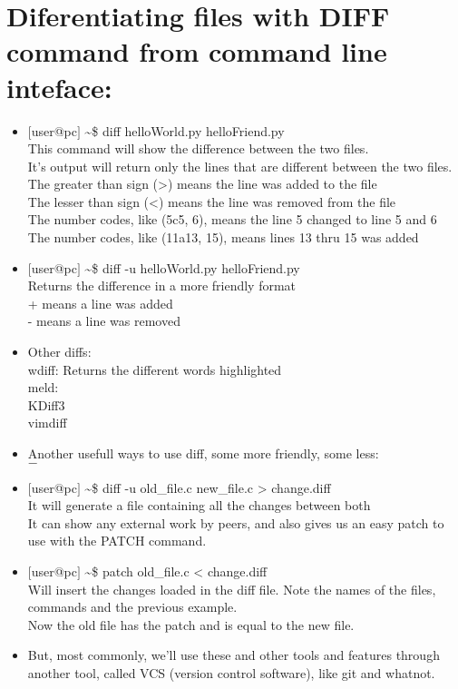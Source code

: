 \documentclass[12pt,a4paper]{article} %
\begin{document}
\section{Diferentiating files with DIFF command from command line inteface:}
\begin{itemize}
\item $[$user@pc$]$ \textasciitilde\$ diff helloWorld.py helloFriend.py\\
\tabto{1.1cm} This command will show the difference between the two files.\\
\tabto{1.1cm}It's output will return only the lines that are different between the two files.\\
\tabto{2.2cm}The greater than sign (>) means the line was added to the file\\
\tabto{2.2cm}The lesser than sign (<) means the line was removed from the file\\
\tabto{2.2cm}The number codes, like (5c5, 6), means the line 5 changed to line 5 and 6\\
\tabto{2.2cm}The number codes, like (11a13, 15), means lines 13 thru 15 was added\\
\item $[$user@pc$]$ \textasciitilde\$ diff -u helloWorld.py helloFriend.py\\
\tabto{1.1cm}Returns the difference in a more friendly format\\
\tabto{2.2cm}+ means a line was added\\
\tabto{2.2cm}- means a line was removed\\
\item Other diffs:\\
\tabto{1.1cm}wdiff: Returns the different words highlighted\\
\tabto{1.1cm}meld:\\
\tabto{1.1cm}KDiff3\\
\tabto{1.1cm}vimdiff\\
\item Another usefull ways to use diff, some more friendly, some less:\\
\tabto{1.1cm}$-$
\item $[$user@pc$]$ \textasciitilde\$ diff -u old\_file.c new\_file.c > change.diff\\
\tabto{1.1cm}It will generate a file containing all the changes between both\\
\tabto{1.1cm}It can show any external work by peers, and also gives us an easy patch to use with the PATCH command.\\
\item $[$user@pc$]$ \textasciitilde\$ patch old\_file.c < change.diff\\
\tabto{1.1cm}Will insert the changes loaded in the diff file. Note the names of the files, commands and the previous example.\\
Now the old file has the patch and is equal to the new file.\\
\item But, most commonly, we'll use these and other tools and features through another tool, called VCS (version control software), like git and whatnot.
\end{itemize}
\end{document}
